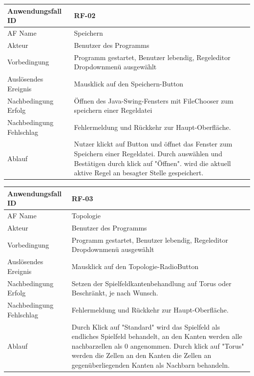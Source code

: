 \documentclass[11pt]{article}
\begin{document}
    \begin{tabular}[m]{|m{7cm}|m{9cm}|}
        \hline
        Anwendungsfall ID     & RF-02 \\ %
        \hline
        AF Name     &  Speichern \\
        \hline
        Akteur&Benutzer des Programms \\
        \hline
        Vorbedingung&Programm gestartet, Benutzer lebendig, Regeleditor Dropdownmenü ausgewählt\\
        \hline
        Auslösendes Ereignis&Mausklick auf den Speichern-Button\\
        \hline
        Nachbedingung Erfolg&Öffnen des Java-Swing-Fensters mit FileChooser zum speichern einer Regeldatei\\
        \hline
        Nachbedingung Fehlschlag&Fehlermeldung und Rückkehr zur Haupt-Oberfläche.\\
        \hline
        Ablauf&Nutzer klickt auf Button und öffnet das Fenster zum Speichern einer Regeldatei. Durch auswählen und Bestätigen durch klick auf "Öffnen". wird die aktuell aktive Regel an besagter Stelle gespeichert.\\
        \hline
    \end{tabular}
    \par

    \begin{tabular}[m]{|m{7cm}|m{9cm}|}
        \hline
        Anwendungsfall ID     & RF-03 \\ %
        \hline
        AF Name     &  Topologie \\
        \hline
        Akteur&Benutzer des Programms \\
        \hline
        Vorbedingung&Programm gestartet, Benutzer lebendig, Regeleditor Dropdownmenü ausgewählt\\
        \hline
        Auslösendes Ereignis&Mausklick auf den Topologie-RadioButton\\
        \hline
        Nachbedingung Erfolg&Setzen der Spielfeldkantenbehandlung auf Torus oder Beschränkt, je nach Wunsch.\\
        \hline
        Nachbedingung Fehlschlag&Fehlermeldung und Rückkehr zur Haupt-Oberfläche.\\
        \hline
        Ablauf&Durch Klick auf "Standard" wird das Spielfeld als endliches Spielfeld behandelt, an den Kanten werden alle nachbarzellen als 0 angenommen.
        Durch klick auf "Torus" werden die Zellen an den Kanten die Zellen an gegenüberliegenden Kanten als Nachbarn behandeln.\\
        \hline
    \end{tabular}
    
\end{document}

